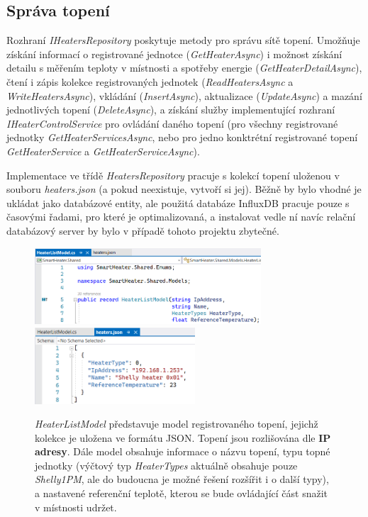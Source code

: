 \subsection{Správa topení}
Rozhraní {\it IHeatersRepository} poskytuje metody pro správu sítě topení. Umožňuje získání informací o registrované jednotce ({\it GetHeaterAsync}) i možnost získání detailu s měřením teploty v místnosti a spotřeby energie ({\it GetHeaterDetailAsync}), čtení i zápis kolekce registrovaných jednotek ({\it ReadHeatersAsync} a {\it WriteHeatersAsync}), vkládání ({\it InsertAsync}), aktualizace ({\it UpdateAsync}) a mazání jednotlivých topení ({\it DeleteAsync}), a získání služby implementující rozhraní {\it IHeaterControlService} pro ovládání daného topení (pro všechny registrované jednotky {\it GetHeaterServicesAsync}, nebo pro jedno konktrétní registrované topení {\it GetHeaterService} a {\it GetHeaterServiceAsync}).
 
Implementace ve třídě {\it HeatersRepository} pracuje s kolekcí topení uloženou v souboru {\it heaters.json} (a pokud neexistuje, vytvoří si jej). Běžně by bylo vhodné je ukládat jako databázové entity, ale použitá databáze InfluxDB pracuje pouze s časovými řadami, pro které je optimalizovaná, a instalovat vedle ní navíc relační databázový server by bylo v případě tohoto projektu zbytečné.

\begin{figure}[hbt]
\centering
\includegraphics[height=2.85cm]{obrazky-figures/code-heaterslistmodel.png}
\includegraphics[height=2.85cm]{obrazky-figures/code-heatersjson.png}
\caption{{\it HeaterListModel} představuje model registrovaného topení, jejichž  kolekce je uložena ve formátu JSON. Topení jsou rozlišována dle \textbf{IP adresy}. Dále model obsahuje informace o názvu topení, typu topné jednotky (výčtový typ {\it HeaterTypes} aktuálně obsahuje pouze {\it Shelly1PM}, ale do budoucna je možné řešení rozšířit i o další typy), a nastavené referenční teplotě, kterou se bude ovládající část snažit v místnosti udržet.}
\end{figure}

